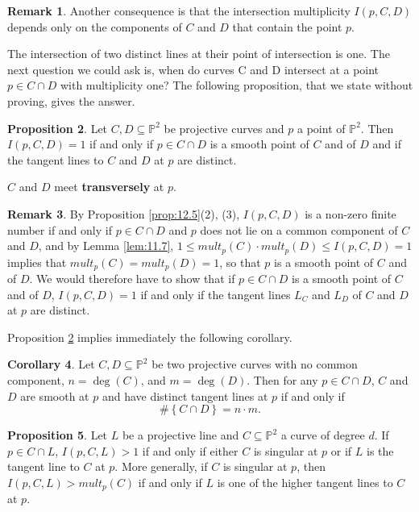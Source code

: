 \documentclass{article}
\renewcommand{\P}{\mathbb{P}}
\newcommand{\rb}[1]{\left( #1 \right)}
\newcommand{\cb}[1]{\left\{ #1 \right\}}
\theoremstyle{definition}\newtheorem{definition}{Definition}[section]
\theoremstyle{definition}\newtheorem{notation}[definition]{Notation}
\theoremstyle{definition}\newtheorem{remark}[definition]{Remark}
\theoremstyle{definition}\newtheorem{example}[definition]{Example}
\theoremstyle{definition}\newtheorem{fact}{Fact}
\theoremstyle{definition}\newtheorem{exercise}{Exercise}
\newtheorem{proposition}[definition]{Proposition}
\newtheorem{corollary}[definition]{Corollary}
\begin{document}
\begin{remark}
Another consequence is that the intersection multiplicity $ I\rb{p, C, D} $ depends only on the components of $ C $ and $ D $ that contain the point $ p $.
\end{remark}

The intersection of two distinct lines at their point of intersection is one. The next question we could ask is, when do curves C and D intersect at a point $ p \in C \cap D $ with multiplicity one? The following proposition, that we state without proving, gives the answer.

\begin{proposition}
\label{prop:12.11}
Let $ C, D \subseteq \P^2 $ be projective curves and $ p $ a point of $ \P^2 $. Then $ I\rb{p, C, D} = 1 $ if and only if $ p \in C \cap D $ is a smooth point of $ C $ and of $ D $ and if the tangent lines to $ C $ and $ D $ at $ p $ are distinct.
\end{proposition}

$ C $ and $ D $ meet \textbf{transversely} at $ p $.

\begin{remark}
By Proposition \ref{prop:12.5}(2), (3), $ I\rb{p, C, D} $ is a non-zero finite number if and only if $ p \in C \cap D $ and $ p $ does not lie on a common component of $ C $ and $ D $, and by Lemma \ref{lem:11.7}, $ 1 \le mult_p\rb{C} \cdot mult_p\rb{D} \le I\rb{p, C, D} = 1 $ implies that $ mult_p\rb{C} = mult_p\rb{D} = 1 $, so that $ p $ is a smooth point of $ C $ and of $ D $. We would therefore have to show that if $ p \in C \cap D $ is a smooth point of $ C $ and of $ D $, $ I\rb{p, C, D} = 1 $ if and only if the tangent lines $ L_C $ and $ L_D $ of $ C $ and $ D $ at $ p $ are distinct.
\end{remark}

Proposition \ref{prop:12.11} implies immediately the following corollary.

\begin{corollary}
Let $ C, D \subseteq \P^2 $ be two projective curves with no common component, $ n = \deg\rb{C} $, and $ m = \deg\rb{D} $. Then for any $ p \in C \cap D $, $ C $ and $ D $ are smooth at $ p $ and have distinct tangent lines at $ p $ if and only if
$$ \#\cb{C \cap D} = n \cdot m. $$
\end{corollary}

\begin{proposition}
\label{prop:12.14}
Let $ L $ be a projective line and $ C \subseteq \P^2 $ a curve of degree $ d $. If $ p \in C \cap L $, $ I\rb{p, C, L} > 1 $ if and only if either $ C $ is singular at $ p $ or if $ L $ is the tangent line to $ C $ at $ p $. More generally, if $ C $ is singular at $ p $, then $ I\rb{p, C, L} > mult_p\rb{C} $ if and only if $ L $ is one of the higher tangent lines to $ C $ at $ p $.
\end{proposition}
\end{document}
